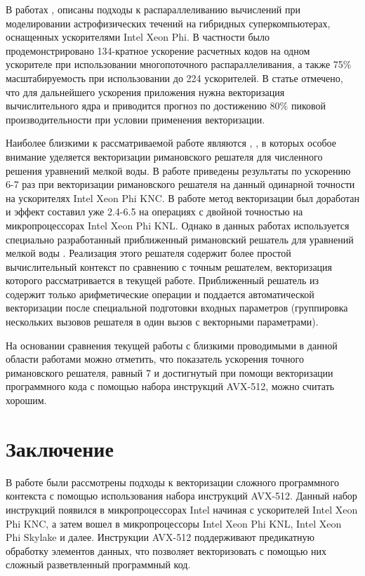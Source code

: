 \documentclass[utf8]{psta}
\begin{document}
В работах \cite{Kulikov}, \cite{Kulikov2} описаны подходы к распараллеливанию вычислений при моделировании астрофизических течений на гибридных суперкомпьютерах, оснащенных ускорителями Intel Xeon Phi.
В частности было продемонстрировано 134-кратное ускорение расчетных кодов на одном ускорителе при использовании многопоточного распараллеливания, а также 75\% масштабируемость при использовании до 224 ускорителей.
В статье отмечено, что для дальнейшего ускорения приложения нужна векторизация вычислительного ядра и приводится прогноз по достижению 80\% пиковой производительности при условии применения векторизации.

Наиболее близкими к рассматриваемой работе являются \cite{BaderSWEVect}, \cite{FerreiraSWEVect}, в которых особое внимание уделяется векторизации римановского решателя для численного решения уравнений мелкой воды.
В работе \cite{BaderSWEVect} приведены результаты по ускорению 6-7 раз при векторизации римановского решателя на данный одинарной точности на ускорителях Intel Xeon Phi KNC.
В работе \cite{FerreiraSWEVect} метод векторизации был доработан и эффект составил уже 2.4-6.5 на операциях с двойной точностью на микропроцессорах Intel Xeon Phi KNL.
Однако в данных работах используется специально разработанный приближенный римановский решатель для уравнений мелкой воды \cite{George}.
Реализация этого решателя содержит более простой вычислительный контекст по сравнению с точным решателем, векторизация которого рассматривается в текущей работе.
Приближенный решатель из \cite{George} содержит только арифметические операции и поддается автоматической векторизации после специальной подготовки входных параметров (группировка нескольких вызовов решателя в один вызов с векторными параметрами).

На основании сравнения текущей работы с близкими проводимыми в данной области работами можно отметить, что показатель ускорения точного римановского решателя, равный 7 и достигнутый при помощи векторизации программного кода с помощью набора инструкций AVX-512, можно считать хорошим.

\section*{Заключение}

В работе были рассмотрены подходы к векторизации сложного программного контекста с помощью использования набора инструкций AVX-512.
Данный набор инструкций появился в микропроцессорах Intel начиная с ускорителей Intel Xeon Phi KNC, а затем вошел в микропроцессоры Intel Xeon Phi KNL, Intel Xeon Phi Skylake и далее.
Инструкции AVX-512 поддерживают предикатную обработку элементов данных, что позволяет векторизовать с помощью них сложный разветвленный программный код.
\end{document}
